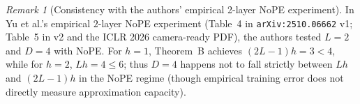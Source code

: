 \documentclass[11pt]{article}
\theoremstyle{plain}
\theoremstyle{definition}
\theoremstyle{remark}
\newtheorem{remark}{Remark}
\newcommand{\1}{\mathbf{1}}
\begin{document}
\begin{remark}[Consistency with the authors' empirical 2-layer NoPE experiment]
In Yu et al.'s empirical $2$-layer NoPE experiment (Table~4 in \texttt{arXiv:2510.06662} v1; Table~5 in v2 and the ICLR 2026 camera-ready PDF), the authors tested $L = 2$ and $D = 4$ with NoPE. For $h = 1$, Theorem~B achieves $(2L - 1)h = 3 < 4$, while for $h = 2$, $Lh = 4 \le 6$; thus $D = 4$ happens not to fall strictly between $Lh$ and $(2L - 1)h$ in the NoPE regime (though empirical training error does not directly measure approximation capacity).
\end{remark}
\end{document}
